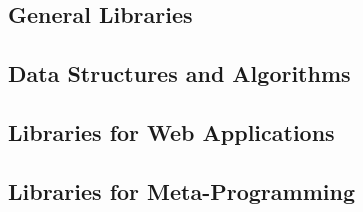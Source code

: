 \documentclass[11pt,fleqn]{article}
\begin{document}
{\subsection{General Libraries}









































%



\subsection{Data Structures and Algorithms}












\subsection{Libraries for Web Applications}











\subsection{Libraries for Meta-Programming}














} %
\end{document}
